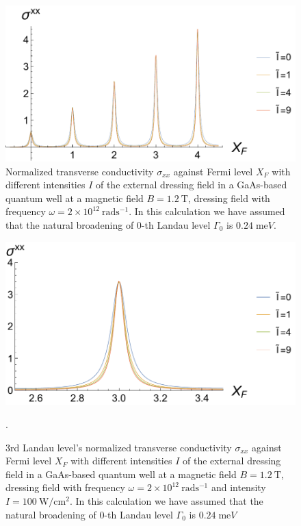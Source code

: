 \begin{figure}[t]
\includegraphics[scale=0.55]{figures/fig_5}
\caption{\label{fig_4} Normalized transverse conductivity $\sigma_{xx}$ against Fermi level $X_F$ with different intensities $I$ of the external dressing field in a GaAs-based quantum well at a magnetic field $B = 1.2~\text{T}$, dressing field with frequency $\omega =2\times10^{12}~\text{rad}\text{s}^{-1}$. In this calculation we have assumed that the natural  broadening of $0$-th Landau level $\Gamma_0$ is $0.24\;\text{me}V$.}
\end{figure}
\begin{figure}[t]
\includegraphics[scale=0.55]{figures/fig_6}
\caption{\label{fig_5} $3$rd Landau level’s normalized transverse conductivity $\sigma_{xx}$ against Fermi level $X_F$ with different intensities $I$ of the external dressing field in a GaAs-based quantum well at a magnetic field $B = 1.2~\text{T}$, dressing field with frequency $\omega =2\times10^{12}~\text{rad}\text{s}^{-1}$ and intensity $I =100~\text{W}/\text{cm}^{2}$. In this calculation we have assumed that the natural  broadening of $0$-th Landau level $\Gamma_0$ is $0.24\;\text{me}V$}.
\end{figure}

